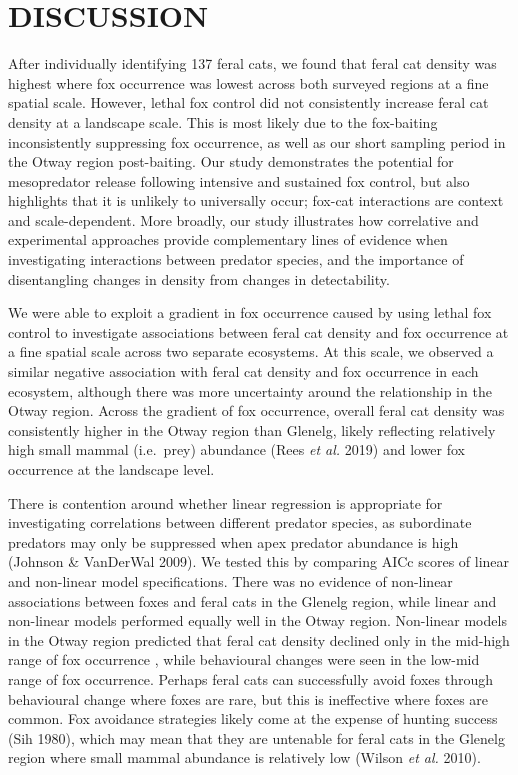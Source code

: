 \documentclass[]{elsarticle} %
\begin{document}
\newpage

\hypertarget{discussion}{%
\section{DISCUSSION}\label{discussion}}

After individually identifying 137 feral cats, we found that feral cat density was highest where fox occurrence was lowest across both surveyed regions at a fine spatial scale. However, lethal fox control did not consistently increase feral cat density at a landscape scale. This is most likely due to the fox-baiting inconsistently suppressing fox occurrence, as well as our short sampling period in the Otway region post-baiting. Our study demonstrates the potential for mesopredator release following intensive and sustained fox control, but also highlights that it is unlikely to universally occur; fox-cat interactions are context and scale-dependent. More broadly, our study illustrates how correlative and experimental approaches provide complementary lines of evidence when investigating interactions between predator species, and the importance of disentangling changes in density from changes in detectability.

We were able to exploit a gradient in fox occurrence caused by using lethal fox control to investigate associations between feral cat density and fox occurrence at a fine spatial scale across two separate ecosystems. At this scale, we observed a similar negative association with feral cat density and fox occurrence in each ecosystem, although there was more uncertainty around the relationship in the Otway region. Across the gradient of fox occurrence, overall feral cat density was consistently higher in the Otway region than Glenelg, likely reflecting relatively high small mammal (i.e.~prey) abundance (Rees \emph{et al.} 2019) and lower fox occurrence at the landscape level.

There is contention around whether linear regression is appropriate for investigating correlations between different predator species, as subordinate predators may only be suppressed when apex predator abundance is high (Johnson \& VanDerWal 2009). We tested this by comparing AICc scores of linear and non-linear model specifications. There was no evidence of non-linear associations between foxes and feral cats in the Glenelg region, while linear and non-linear models performed equally well in the Otway region. Non-linear models in the Otway region predicted that feral cat density declined only in the mid-high range of fox occurrence , while behavioural changes were seen in the low-mid range of fox occurrence. Perhaps feral cats can successfully avoid foxes through behavioural change where foxes are rare, but this is ineffective where foxes are common. Fox avoidance strategies likely come at the expense of hunting success (Sih 1980), which may mean that they are untenable for feral cats in the Glenelg region where small mammal abundance is relatively low (Wilson \emph{et al.} 2010).
\end{document}
